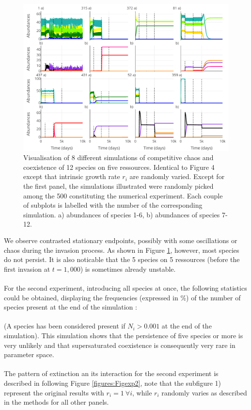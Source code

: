 \begin{figure}[H]
\begin{center} 
 \includegraphics[width=1\textwidth]{../Code/Figures/Figure_exp1.pdf}
  \caption{Visualisation of 8 different simulations of competitive chaos and coexistence of 12 species on five ressources. Identical to Figure 4 except that intrinsic growth rate $r_i$ are randomly varied. Except for the first panel, the simulations illustrated were randomly picked among the 500 constituting the numerical experiment. Each couple of subplots is labelled with the number of the corresponding simulation. a) abundances of species 1-6, b) abundances of species 7-12.}
  \label{figures:Figexp1}
\end{center}
\end{figure}

We observe contrasted stationary endpoints, possibly with some oscillations or chaos during the invasion process. As shown in Figure \ref{figures:Figexp1}, however, most species do not persist. It is also noticable that the 5 species on 5 ressources (before the first invasion at $t=1,000$) is sometimes already unstable.\\
\\
For the second experiment, introducing all species at once, the  following statistics could be obtained, displaying the frequencies (expressed in 
\%) of the number of species present at the end of the simulation :  \\


\\
(A species has been considered present if $N_i > 0.001$ at the end of the simulation). This simulation shows that the persistence of five species or more is very unlikely and that supersaturated coexistence is consequently very rare in parameter space.\\
\\
The pattern of extinction an its interaction for the second experiment is described in following Figure \ref{figures:Figexp2}, note that the subfigure 1) represent the original results with $r_i=1 ~\forall i$, while $r_i$ randomly varies as described in the methods for all other panels.

